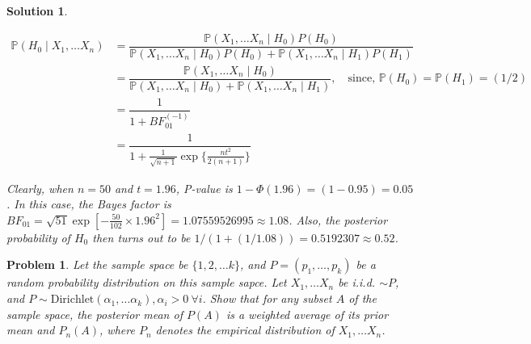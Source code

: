 \documentclass[12pt]{article}
\theoremstyle{problemstyle}
\newtheorem{pbm}{Problem}
\newtheorem*{solution*}{Solution}
\newenvironment{problem}{
\begin{tcolorbox}[colback=green!10!white,colframe=black!75!black, parbox = false]\begin{pbm} }{\end{pbm}\end{tcolorbox} }
\newcommand{\prob}{\mathbb{P}}
\begin{document}
\begin{solution*}
\begin{enumerate}
        \begin{align*}
            \prob(H_0 \mid X_1, \dots X_n)
            & = \dfrac{\prob(X_1, \dots X_n \mid H_0)P(H_0)}{\prob(X_1, \dots X_n \mid H_0)P(H_0) + \prob(X_1, \dots X_n \mid H_1)P(H_1)}\\
            & = \dfrac{\prob(X_1, \dots X_n \mid H_0)}{\prob(X_1, \dots X_n \mid H_0) + \prob(X_1, \dots X_n \mid H_1)}, \quad \text{since, } \prob(H_0) = \prob(H_1) = (1/2)\\
            & = \dfrac{1}{1 + BF_{01}^{(-1)}}\\
            & = \dfrac{1}{1 + \frac{1}{\sqrt{n+1}}\exp\{\frac{nt^2}{2(n+1)}\} }
        \end{align*}

        Clearly, when $n = 50$ and $t = 1.96$, P-value is $1 - \Phi(1.96) = (1 - 0.95) = 0.05$. In this case, the Bayes factor is $BF_{01} = \sqrt{51} \exp\left[ -\frac{50}{102}\times 1.96^2 \right] = 1.07559526995 \approx 1.08$. Also, the posterior probability of $H_0$ then turns out to be $1/(1 + (1/1.08)) = 0.5192307 \approx 0.52$.
    \end{enumerate}
\end{solution*}
\pagebreak

\begin{problem}
    Let the sample space be $\{ 1, 2, \dots k \}$, and $P = (p_1, \dots, p_k)$ be a random probability distribution on this sample sapce. Let $X_1, \dots X_n$ be i.i.d. $\sim P$, and $P \sim \text{Dirichlet}(\alpha_1, \dots \alpha_k), \alpha_i > 0 \ \forall i$. Show that for any subset $A$ of the sample space, the posterior mean of $P(A)$ is a weighted average of its prior mean and $P_n(A)$, where $P_n$ denotes the empirical distribution of $X_1, \dots X_n$.
\end{problem}
\end{document}
